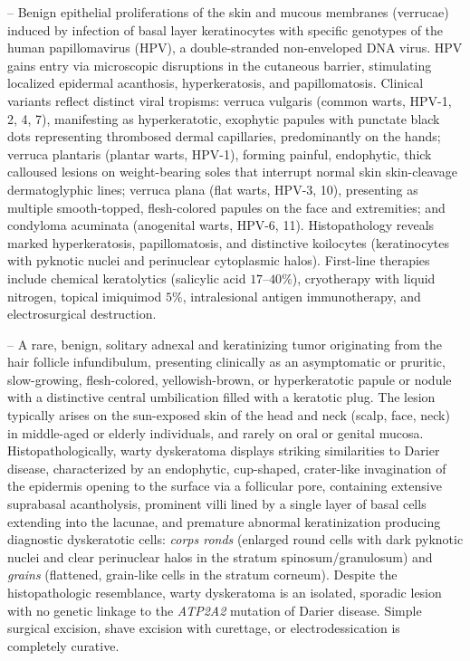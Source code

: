 -- Benign epithelial proliferations of the skin and mucous membranes (verrucae) induced by infection of basal layer keratinocytes with specific genotypes of the human papillomavirus (HPV), a double-stranded non-enveloped DNA virus. HPV gains entry via microscopic disruptions in the cutaneous barrier, stimulating localized epidermal acanthosis, hyperkeratosis, and papillomatosis. Clinical variants reflect distinct viral tropisms: verruca vulgaris (common warts, HPV-1, 2, 4, 7), manifesting as hyperkeratotic, exophytic papules with punctate black dots representing thrombosed dermal capillaries, predominantly on the hands; verruca plantaris (plantar warts, HPV-1), forming painful, endophytic, thick calloused lesions on weight-bearing soles that interrupt normal skin skin-cleavage dermatoglyphic lines; verruca plana (flat warts, HPV-3, 10), presenting as multiple smooth-topped, flesh-colored papules on the face and extremities; and condyloma acuminata (anogenital warts, HPV-6, 11). Histopathology reveals marked hyperkeratosis, papillomatosis, and distinctive koilocytes (keratinocytes with pyknotic nuclei and perinuclear cytoplasmic halos). First-line therapies include chemical keratolytics (salicylic acid $17\text{--}40\%$), cryotherapy with liquid nitrogen, topical imiquimod $5\%$, intralesional antigen immunotherapy, and electrosurgical destruction.

-- A rare, benign, solitary adnexal and keratinizing tumor originating from the hair follicle infundibulum, presenting clinically as an asymptomatic or pruritic, slow-growing, flesh-colored, yellowish-brown, or hyperkeratotic papule or nodule with a distinctive central umbilication filled with a keratotic plug. The lesion typically arises on the sun-exposed skin of the head and neck (scalp, face, neck) in middle-aged or elderly individuals, and rarely on oral or genital mucosa. Histopathologically, warty dyskeratoma displays striking similarities to Darier disease, characterized by an endophytic, cup-shaped, crater-like invagination of the epidermis opening to the surface via a follicular pore, containing extensive suprabasal acantholysis, prominent villi lined by a single layer of basal cells extending into the lacunae, and premature abnormal keratinization producing diagnostic dyskeratotic cells: \textit{corps ronds} (enlarged round cells with dark pyknotic nuclei and clear perinuclear halos in the stratum spinosum/granulosum) and \textit{grains} (flattened, grain-like cells in the stratum corneum). Despite the histopathologic resemblance, warty dyskeratoma is an isolated, sporadic lesion with no genetic linkage to the \textit{ATP2A2} mutation of Darier disease. Simple surgical excision, shave excision with curettage, or electrodessication is completely curative.

